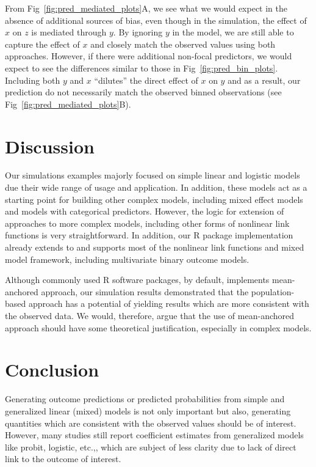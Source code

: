 \documentclass[10pt,letterpaper]{article}
\let\proglang=\textsf
\begin{document}
From Fig~\ref{fig:pred_mediated_plots}A, we see what we would expect in the absence of additional sources of bias, even though in the simulation, the effect of $x$ on $z$ is mediated through $y$. By ignoring $y$ in the model, we are still able to capture the effect of $x$ and closely match the observed values using both approaches. However, if there were additional non-focal predictors, we would expect to see the differences similar to those in Fig~\ref{fig:pred_bin_plots}. Including both $y$ and $x$ ``dilutes'' the direct effect of $x$ on $y$ and as a result, our prediction do not necessarily match the observed binned observations (see Fig~\ref{fig:pred_mediated_plots}B).

\section*{Discussion}

Our simulations examples majorly focused on simple linear and logistic models due their wide range of usage and application. In addition, these models act as a starting point for building other complex models, including mixed effect models and models with categorical predictors. However, the logic for extension of approaches to more complex models, including other forms of nonlinear link functions is very straightforward. In addition, our \proglang{R} package implementation already extends to and supports most of the nonlinear link functions and mixed model framework, including multivariate binary outcome models.

Although commonly used \proglang{R} software packages, by default, implements mean-anchored approach, our simulation results demonstrated that the population-based approach has a potential of yielding results which are more consistent with the observed data. We would, therefore, argue that the use of mean-anchored approach should have some theoretical justification, especially in complex models. 

\section*{Conclusion}

Generating outcome predictions or predicted probabilities from simple and generalized linear (mixed) models is not only important but also, generating quantities which are consistent with the observed values should be of interest. However, many studies still report coefficient estimates from generalized models like probit, logistic, etc.,\cite{hanmer2013behind}, which are subject of less clarity due to lack of direct link to the outcome of interest.
\end{document}
